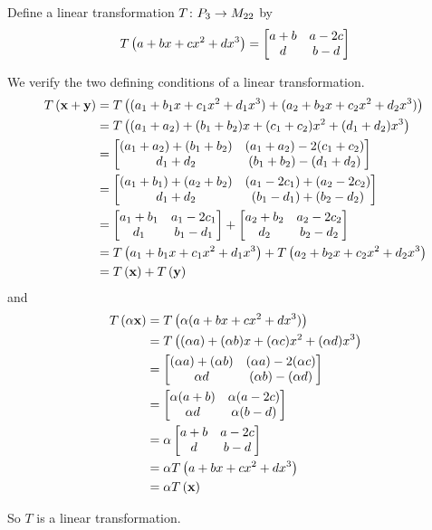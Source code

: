 \documentclass{ximera}
\begin{document}
\begin{example}

Define a linear transformation $T\colon P_3\rightarrow M_{22}$ by
\[
T\left(a+bx+cx^2+dx^3\right)=\begin{bmatrix}a+b&a-2c\\d&b-d\end{bmatrix}
\]

We verify the two defining conditions of a linear transformation.
\begin{align*}
T\left(\mathbf{x}+\mathbf{y}\right)&=
T\left((a_1+b_1x+c_1x^2+d_1x^3)+(a_2+b_2x+c_2x^2+d_2x^3)\right)\\
&=T\left((a_1+a_2)+(b_1+b_2)x+(c_1+c_2)x^2+(d_1+d_2)x^3\right)\\
&=\begin{bmatrix}
(a_1+a_2)+(b_1+b_2)&(a_1+a_2)-2(c_1+c_2)\\
d_1+d_2&(b_1+b_2)-(d_1+d_2)
\end{bmatrix}\\
&=\begin{bmatrix}
(a_1+b_1)+(a_2+b_2)&(a_1-2c_1)+(a_2-2c_2)\\
d_1+d_2&(b_1-d_1)+(b_2-d_2)
\end{bmatrix}\\
&=\begin{bmatrix}a_1+b_1&a_1-2c_1\\d_1&b_1-d_1\end{bmatrix}+
     \begin{bmatrix}a_2+b_2&a_2-2c_2\\d_2&b_2-d_2\end{bmatrix}\\
&=T\left(a_1+b_1x+c_1x^2+d_1x^3\right)+T\left(a_2+b_2x+c_2x^2+d_2x^3\right)\\
&=T\left(\mathbf{x}\right)+T\left(\mathbf{y}\right)
\end{align*}
and
\begin{align*}
T\left(\alpha\mathbf{x}\right)&=T\left(\alpha(a+bx+cx^2+dx^3)\right)\\
&=T\left((\alpha a)+(\alpha b)x+(\alpha c)x^2+(\alpha d)x^3\right)\\
&=\begin{bmatrix}
(\alpha a)+(\alpha b)&(\alpha a)-2(\alpha c)\\
\alpha d&(\alpha b)-(\alpha d)
\end{bmatrix}\\
&=\begin{bmatrix}
\alpha(a+b)&\alpha(a-2c)\\
\alpha d&\alpha(b-d)
\end{bmatrix}\\
&=\alpha\begin{bmatrix}a+b&a-2c\\d&b-d\end{bmatrix}\\
&=\alpha T\left(a+bx+cx^2+dx^3\right)\\
&=\alpha T\left(\mathbf{x}\right)
\end{align*}

So $T$ is a linear transformation.
\end{example}
\end{document}
